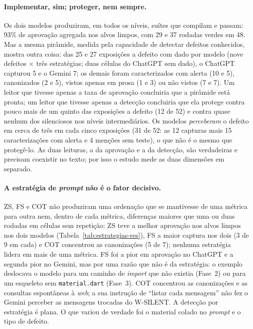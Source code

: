 \documentclass[12pt]{article}
\begin{document}
\paragraph{Implementar, sim; proteger, nem sempre.} Os dois modelos
produziram, em todos os níveis, suítes que compilam e passam: 93\% de
aprovação agregada nos alvos limpos, com 29 e 37 rodadas verdes em 48. Mas a
mesma pirâmide, medida pela capacidade de detectar defeitos conhecidos,
mostra outra coisa: das 25 e 27 exposições a defeito com dado por modelo
(nove defeitos $\times$ três estratégias; duas células do ChatGPT sem dado),
o ChatGPT capturou 5 e o Gemini 7; os demais foram caracterizados com alerta (10 e 5), canonizados
(2 e 5), vistos apenas em prosa (1 e 3) ou não vistos (7 e 7). Um leitor que
tivesse apenas a taxa de aprovação concluiria que a pirâmide está pronta;
um leitor que tivesse apenas a detecção concluiria que ela protege contra
pouco mais de um quinto das exposições a defeito (12 de 52) e contra quase
nenhum dos silenciosos nos níveis intermediários. Os modelos
\emph{perceberam} o defeito em cerca de três em cada cinco exposições (31 de
52: as 12 capturas mais 15 caracterizações com alerta e 4 menções sem teste),
o que não é o mesmo que protegê-lo. As duas leituras, a da aprovação e a da
detecção, são verdadeiras e precisam coexistir no texto; por isso o estudo
mede as duas dimensões em separado.

\paragraph{A estratégia de \textit{prompt} não é o fator decisivo.} ZS, FS e
COT não produziram uma ordenação que se mantivesse de uma métrica para outra
nem, dentro de cada métrica, diferenças maiores que uma ou duas rodadas em
células sem repetição: ZS teve a melhor aprovação nos alvos limpos nos dois
modelos (Tabela~\ref{tab:estrategias-res}), FS a maior captura nos dois (3
de 9 em cada) e COT concentrou as canonizações (5 de 7); nenhuma estratégia
lidera em mais de uma métrica. FS foi a pior em aprovação no ChatGPT e a segunda pior no Gemini,
mas por uma razão que não é da estratégia: o exemplo deslocava o modelo para um caminho de
\textit{import} que não existia (Fase~2) ou para um esqueleto sem
\texttt{material.dart} (Fase~3). COT concentrou as canonizações e as
consultas espontâneas à \textit{web}; a sua instrução de ``listar cada
mensagem'' não fez o Gemini perceber as mensagens trocadas do W-SILENT. A
detecção por estratégia é plana. O que variou de verdade foi o material
colado no \textit{prompt} e o tipo de defeito.
\end{document}
